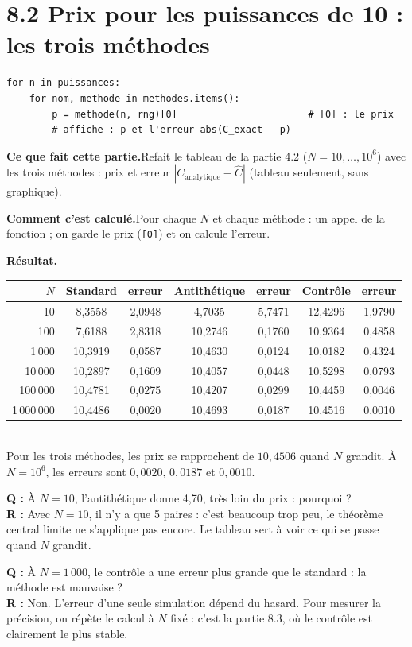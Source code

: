 \documentclass[11pt,a4paper]{article}
\newcommand{\quoi}[1]{\par\noindent\textbf{\color{bleu}Ce que fait cette partie.}\enspace #1\par}
\newcommand{\calcul}[1]{\par\noindent\textbf{\color{bleu}Comment c'est calculé.}\enspace #1\par}
\newcommand{\resultat}[1]{\par\noindent\textbf{\color{vert}Résultat.}\enspace #1\par}
\newcommand{\prof}[2]{\begin{tcolorbox}[colback=orange!6,colframe=orange!80,boxrule=0.4pt,arc=2pt,left=5pt,right=5pt,top=2pt,bottom=2pt]\small\textbf{Q :} #1\\[1pt]\textbf{R :} #2\end{tcolorbox}}
\newcommand{\sect}[1]{\clearpage\section{#1}}
\begin{document}
\sect{8.2 Prix pour les puissances de 10 : les trois méthodes}
\begin{lstlisting}
for n in puissances:
    for nom, methode in methodes.items():
        p = methode(n, rng)[0]                       # [0] : le prix
        # affiche : p et l'erreur abs(C_exact - p)
\end{lstlisting}
\quoi{Refait le tableau de la partie 4.2 ($N = 10, \dots, 10^6$) avec les trois méthodes : prix et erreur $|C_{\text{analytique}} - \hat C|$ (tableau seulement, sans graphique).}
\calcul{Pour chaque $N$ et chaque méthode : un appel de la fonction ; on garde le prix (\texttt{[0]}) et on calcule l'erreur.}
\resultat{\small
\begin{tabular}{rcccccc}
\toprule
$N$ & Standard & erreur & Antithétique & erreur & Contrôle & erreur \\
\midrule
10 & 8,3558 & 2,0948 & 4,7035 & 5,7471 & 12,4296 & 1,9790 \\
100 & 7,6188 & 2,8318 & 10,2746 & 0,1760 & 10,9364 & 0,4858 \\
1\,000 & 10,3919 & 0,0587 & 10,4630 & 0,0124 & 10,0182 & 0,4324 \\
10\,000 & 10,2897 & 0,1609 & 10,4057 & 0,0448 & 10,5298 & 0,0793 \\
100\,000 & 10,4781 & 0,0275 & 10,4207 & 0,0299 & 10,4459 & 0,0046 \\
1\,000\,000 & 10,4486 & 0,0020 & 10,4693 & 0,0187 & 10,4516 & 0,0010 \\
\bottomrule
\end{tabular}\\[4pt]
Pour les trois méthodes, les prix se rapprochent de $10{,}4506$ quand $N$ grandit. À $N = 10^6$, les erreurs sont $0{,}0020$, $0{,}0187$ et $0{,}0010$.}
\prof{À $N = 10$, l'antithétique donne 4,70, très loin du prix : pourquoi ?}{Avec $N = 10$, il n'y a que 5 paires : c'est beaucoup trop peu, le théorème central limite ne s'applique pas encore. Le tableau sert à voir ce qui se passe quand $N$ grandit.}
\prof{À $N = 1\,000$, le contrôle a une erreur plus grande que le standard : la méthode est mauvaise ?}{Non. L'erreur d'une seule simulation dépend du hasard. Pour mesurer la précision, on répète le calcul à $N$ fixé : c'est la partie 8.3, où le contrôle est clairement le plus stable.}
\end{document}
